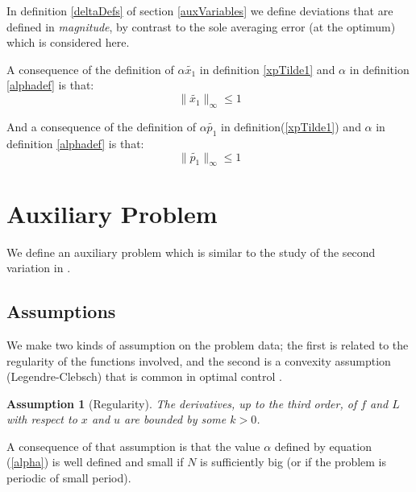 \documentclass[a4paper,10pt]{article}
\newtheorem{assumption}{Assumption}
\begin{document}
In definition \ref{deltaDefs} of 
section \ref{auxVariables} we define deviations that are defined in 
{\em magnitude}, by contrast to the sole averaging error (at the 
optimum) which is considered here.

 
A consequence of the definition of $\alpha \tilde{x_{1}}$ in 
definition \ref{xpTilde1} and $\alpha$ in definition \ref{alphadef} is that:
\begin{equation}
    \|\tilde{x_{1}}\|_{\infty} \leq 1
    \label{xtilde1le1}
\end{equation}

And a consequence of the definition of $\alpha \tilde{p_{1}}$ in 
definition(\ref{xpTilde1}) and 
$\alpha$ in definition \ref{alphadef} is that:
\begin{equation}
    \|\tilde{p_{1}}\|_{\infty} \leq 1
    \label{ptilde1le1}
\end{equation}

\section{Auxiliary Problem}\label{auxProblem}
We define an auxiliary problem which is similar to the study of the 
second variation in \cite{Bry1}.
\subsection{Assumptions}\label{Assumptions}
We make two kinds of assumption on the problem data; the 
first is related to the regularity of the functions involved, and the 
second is a convexity assumption (Legendre-Clebsch) that is common in optimal control 
\cite{Bry1,bensPert,chaplais}.
\begin{assumption}[Regularity]\label{boundedDeriv}
    The derivatives, up to the third order, of $f$ and $L$ with respect to $x$ and $u$ are 
bounded by some $k>0$. 
\end{assumption}
A consequence of that assumption is that the value $\alpha$ defined by 
equation (\ref{alpha}) is well defined and small if $N$ is sufficiently 
big (or if the problem is periodic of small period).
\end{document}
